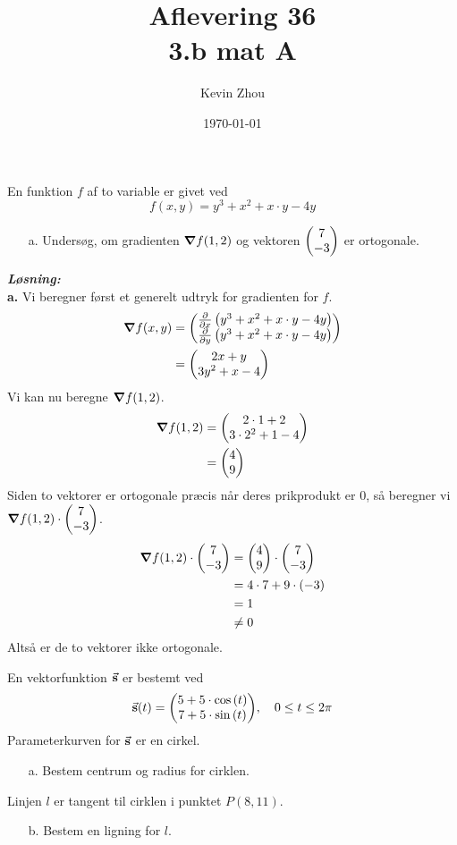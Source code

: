 \documentclass{article}
\title{Aflevering 36\\
{\Large \textbf{3.b mat A}}}
\author{Kevin Zhou}
\date{\today}
\newcommand{\sol}{\setlength{\parindent}{0cm}\textbf{\textit{Løsning:}}\setlength{\parindent}{1cm}}
\begin{document}
\maketitle
\newpage
\begin{question}{}{}
  En funktion $f$ af to variable er givet ved
  \[
  f(x,y)= y^3+x^2+x \cdot y -4y
  \] 
  \begin{itemize}
    \item[a.] Undersøg, om gradienten $\grad f(1,2)$ og vektoren $\mqty(7\\ -3) $ er ortogonale. 
  \end{itemize}
\end{question}
\sol \\
\textbf{a.}
Vi beregner først et generelt udtryk for gradienten for $f$.
\begin{equation*}
\begin{split}
  \grad f(x,y)&=\mqty(\pdv{x} \left(y^3+x^2+x \cdot y -4y\right)\\ \pdv{y} \left(y^3+x^2+x \cdot y -4y\right)) \\
  &=\mqty(2x+y\\ 3y^2+x-4) 
\end{split}
\end{equation*}
Vi kan nu beregne $\grad f(1,2)$.
\begin{equation*}
\begin{split}
  \grad f(1,2)&=\mqty(2 \cdot 1 +2\\ 3 \cdot 2^2 + 1 -4) \\
  &=\mqty(4\\ 9) 
\end{split}
\end{equation*}
Siden to vektorer er ortogonale præcis når deres prikprodukt er 0, så beregner vi $\grad f(1,2) \cdot \mqty(7\\ -3) $.
\begin{equation*}
\begin{split}
  \grad f(1,2) \cdot \mqty(7\\ -3) &= \mqty(4\\ 9) \cdot \mqty(7\\ -3) \\
  &=4 \cdot 7 + 9 \cdot \left(-3\right) \\
  &=1 \\
  &\neq 0
\end{split}
\end{equation*}
Altså er de to vektorer ikke ortogonale.
\begin{question}{}{}
  En vektorfunktion $\va{s} $ er bestemt ved
  \[
  \va{s} (t)=\mqty(5+5 \cdot \cos\left(t\right) \\ 7+5 \cdot \sin\left(t\right) ), \quad 0 \leq t \leq 2 \pi 
  \] 
  Parameterkurven for $\va{s}$ er en cirkel.
  \begin{itemize}
    \item[a.] Bestem centrum og radius for cirklen.
  \end{itemize}
  Linjen $l$ er tangent til cirklen i punktet $P(8,11)$.
  \begin{itemize}
    \item[b.] Bestem en ligning for $l$.
  \end{itemize}
\end{question}
\end{document}
